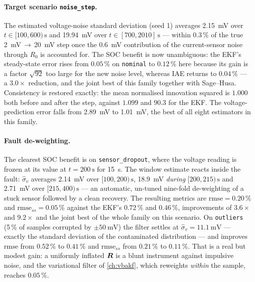 \paragraph{Target scenario \texttt{noise\_step}.}  The estimated voltage-noise standard deviation
(seed 1) averages \SI{2.15}{\milli\volt} over $t\in[100,600)\,\si{\second}$ and
\SI{19.94}{\milli\volt} over $t\in[700,2010]\,\si{\second}$ --- within $0.3\,\%$ of the true
\SI{2}{\milli\volt}\,$\to$\,\SI{20}{\milli\volt} step once the \SI{0.6}{\milli\volt} contribution of
the current-sensor noise through $R_0$ is accounted for.  The SOC benefit is now unambiguous: the
EKF's steady-state error rises from $0.05\,\%$ on \texttt{nominal} to $0.12\,\%$ here because its
gain is a factor $\sqrt{92}$ too large for the new noise level, whereas IAE returns to
$\mathbf{0.04\,\%}$ --- a $3.0\times$ reduction, and the joint best of this family together with
Sage--Husa.  Consistency is restored exactly: the mean normalised innovation squared is $1.000$ both
before and after the step, against $1.099$ and $\mathbf{90.3}$ for the EKF.  The voltage-prediction
error falls from \SI{2.89}{\milli\volt} to \SI{1.01}{\milli\volt}, the best of all eight estimators in
this family.

\paragraph{Fault de-weighting.}  The clearest SOC benefit is on \texttt{sensor\_dropout}, where the
voltage reading is frozen at its value at $t=\SI{200}{\second}$ for \SI{15}{\second}.  The window
estimate reacts inside the fault: $\hat\sigma_v$ averages \SI{2.14}{\milli\volt} over
$[100,200)\,\si{\second}$, \SI{18.9}{\milli\volt} \emph{during} $[200,215)\,\si{\second}$ and
\SI{2.71}{\milli\volt} over $[215,400)\,\si{\second}$ --- an automatic, un-tuned nine-fold
de-weighting of a stuck sensor followed by a clean recovery.  The resulting metrics are
$\mathrm{rmse}=0.20\,\%$ and $\mathrm{rmse}_{ss}=\mathbf{0.05\,\%}$ against the EKF's $0.72\,\%$ and
$0.46\,\%$, improvements of $3.6\times$ and $9.2\times$ and the joint best of the whole family on this
scenario.  On \texttt{outliers} (5\,\% of samples corrupted by $\pm\SI{50}{\milli\volt}$) the filter
settles at $\hat\sigma_v=\SI{11.1}{\milli\volt}$ --- exactly the standard deviation of the
contaminated distribution --- and improves $\mathrm{rmse}$ from $0.52\,\%$ to $0.41\,\%$ and
$\mathrm{rmse}_{ss}$ from $0.21\,\%$ to $0.11\,\%$.  That is a real but modest gain: a uniformly
inflated $\bm{R}$ is a blunt instrument against impulsive noise, and the variational filter of
\cref{ch:vbakf}, which reweights \emph{within} the sample, reaches $0.05\,\%$.

